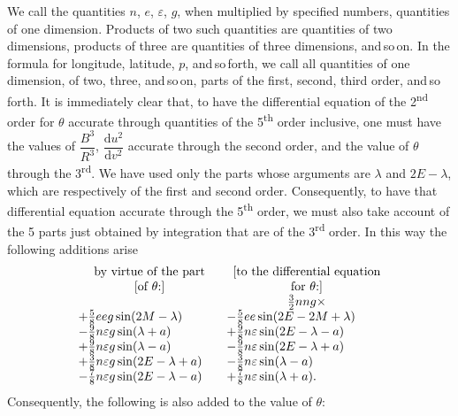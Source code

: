 \clearpage
\begingroup
{}
\renewcommand{\headrulewidth}{0pt}
\par\noindent\hspace*{\parindent}We call the quantities \(n\), \(e\), \(\varepsilon\), \(g\), when multiplied by specified numbers,
quantities of one dimension. Products of two such quantities are quantities of
two dimensions, products of three are quantities of
three dimensions, and\,so\,on. In the formula for longitude, latitude, \(p\), and\,so\,forth,
we call all quantities of one dimension, of two, three, and\,so\,on,
parts of the first, second, third order, and\,so\,forth. It is immediately clear
that, to have the differential equation of the 2\textsuperscript{nd} order for \(\theta\) accurate through
quantities of the 5\textsuperscript{th} order inclusive, one must have the values of
\(\dfrac{B^3}{R^3}\), \(\dfrac{\mathrm{d}u^2}{\mathrm{d}v^2}\) accurate through
the second order, and the value of \(\theta\) through the 3\textsuperscript{rd}.
We have used only the parts whose arguments are \(\lambda\) and \(2E-\lambda\),
which are respectively of the first and second order. Consequently,
to have that differential equation accurate through the 5\textsuperscript{th} order,
we must also take account of the 5 parts just obtained by integration
that are of the 3\textsuperscript{rd} order. In this way the following additions arise
\begingroup\small
\setlength{\arraycolsep}{5pt}
\renewcommand{\arraystretch}{1.2}
\[
\begin{array}{l@{\qquad}l}
\multicolumn{1}{c}{\text{by virtue of the part}}&
\multicolumn{1}{c}{\text{[to the differential equation}}\\
\multicolumn{1}{c}{\text{[of }\theta\text{:]}}&
\multicolumn{1}{c}{\text{for }\theta\text{:]}}\\
&\multicolumn{1}{c}{\tfrac32nng\times}\\
+\tfrac58eeg\sin(2M-\lambda)&-\tfrac58ee\sin(2E-2M+\lambda)\\
-\tfrac98n\varepsilon g\sin(\lambda+a)&+\tfrac98n\varepsilon\sin(2E-\lambda-a)\\
+\tfrac98n\varepsilon g\sin(\lambda-a)&-\tfrac98n\varepsilon\sin(2E-\lambda+a)\\
+\tfrac38n\varepsilon g\sin(2E-\lambda+a)&-\tfrac38n\varepsilon\sin(\lambda-a)\\
-\tfrac78n\varepsilon g\sin(2E-\lambda-a)&+\tfrac78n\varepsilon\sin(\lambda+a).
\end{array}
\]
\endgroup
\noindent Consequently, the following is also added to the value of \(\theta\):
